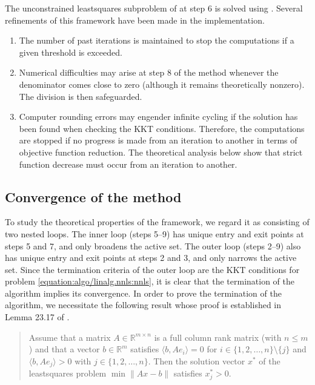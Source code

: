\documentclass[letterpaper,10pt,english]{sphinxmanual}
\newcommand{\norm}[2][]{#1\lVert#2#1\rVert}
\newcommand{\set}[2][]{#1\{#2#1\}}
\newcommand{\inner}[2][]{#1\langle#2#1\rangle}
\def\R{\ensuremath{\mathds{R}}}
\begin{document}
\sphinxAtStartPar
The unconstrained least\sphinxhyphen{}squares subproblem of  at step 6 is solved using
. Several refinements of this framework have been made in
the implementation.
\begin{enumerate}
%
\item {} 
\sphinxAtStartPar
The number of past iterations is maintained to stop the computations if a
given threshold is exceeded.

\item {} 
\sphinxAtStartPar
Numerical difficulties may arise at step 8 of the method whenever the
denominator comes close to zero (although it remains theoretically nonzero).
The division is then safeguarded.

\item {} 
\sphinxAtStartPar
Computer rounding errors may engender infinite cycling if the solution has
been found when checking the KKT conditions. Therefore, the computations are
stopped if no progress is made from an iteration to another in terms of
objective function reduction. The theoretical analysis below show that
strict function decrease must occur from an iteration to another.

\end{enumerate}


\subsection{Convergence of the method}
\label{\detokenize{algo/linalg.nnls:convergence-of-the-method}}
\sphinxAtStartPar
To study the theoretical properties of the framework, we regard it as
consisting of two nested loops. The inner loop (steps 5–9) has unique entry
and exit points at steps 5 and 7, and only broadens the active set. The outer
loop (steps 2–9) also has unique entry and exit points at steps 2 and 3, and
only narrows the active set. Since the termination criteria of the outer loop
are the KKT conditions for problem \eqref{equation:algo/linalg.nnls:nnls}, it is clear that the termination
of the algorithm implies its convergence. In order to prove the termination of
the algorithm, we necessitate the following result whose proof is established
in Lemma 23.17 of .
\begin{quote}

\sphinxAtStartPar
{} Assume that a matrix \(A \in \R^{m \times n}\) is a full
column rank matrix (with \(n \le m\)) and that a vector
\(b \in \R^m\) satisfies \(\inner{b, Ae_i} = 0\) for
\(i \in \set{1, 2, \dots, n} \setminus \set{j}\) and
\(\inner{b, Ae_j} > 0\) with \(j \in \set{1, 2, \dots, n}\). Then
the solution vector \(x^{\ast}\) of the least\sphinxhyphen{}squares problem
\(\min \norm{Ax - b}\) satisfies \(x_j^{\ast} > 0\).
\end{quote}
\end{document}
